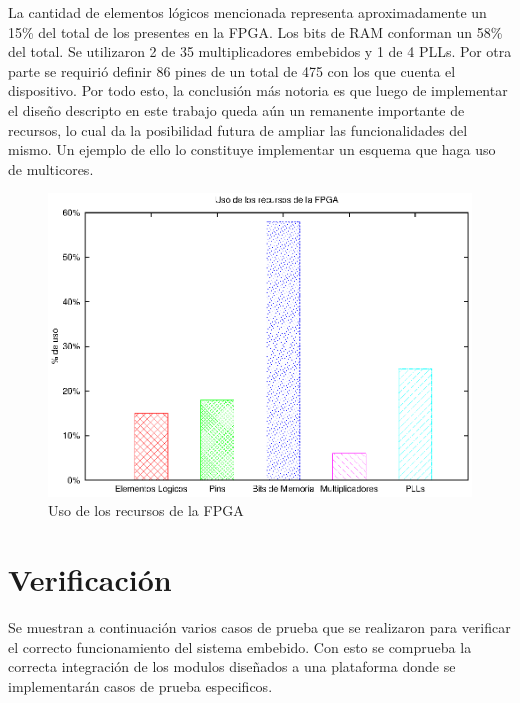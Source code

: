 La cantidad de elementos lógicos mencionada representa aproximadamente un 15\% del total de los presentes en la FPGA. Los bits de RAM conforman un 58\% del total. Se utilizaron 2 de 35 multiplicadores embebidos y 1 de 4 PLLs. Por otra parte se requirió definir 86 pines de un total de 475 con los que cuenta el dispositivo. Por todo esto, la conclusión más notoria es que luego de implementar el diseño descripto en este trabajo queda aún un remanente importante de recursos, lo cual da la posibilidad futura de ampliar las funcionalidades del mismo. Un ejemplo de ello lo constituye implementar un esquema que haga uso de multicores.

\begin{figure}[H]
  \centering
	\includegraphics[scale=0.70]{4-implementacion/graf/fpga.eps}
  \caption{Uso de los recursos de la FPGA}
  \label{fig:fpga}
\end{figure}


\section{Verificación}
Se muestran a continuación varios casos de prueba que se realizaron para verificar el correcto funcionamiento del sistema embebido. Con esto se comprueba la correcta integración de los modulos diseñados a una plataforma donde se implementarán casos de prueba especificos.


